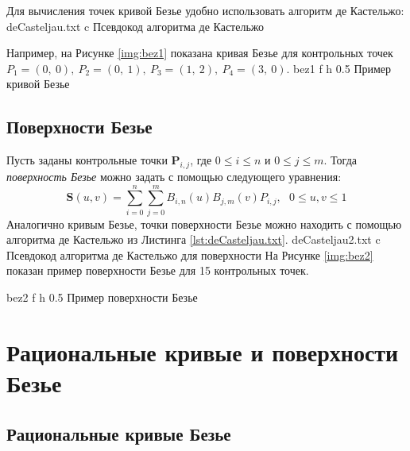 \documentclass{bmstu}
\begin{document}
Для вычисления точек кривой Безье удобно использовать алгоритм де Кастельжо:
{deCasteljau.txt} %
{c} %
{Псевдокод алгоритма де Кастельжо} %

Например, на Рисунке \ref{img:bez1} показана кривая Безье для контрольных точек $P_1 = (0,~0),~P_2=(0,~1),~P_3=(1,~2),~P_4=(3,~0)$.
{bez1} %
{f} %
{h} %
{0.5\textwidth} %
{Пример кривой Безье} %

\subsection{Поверхности Безье}

Пусть заданы контрольные точки $\mathbf{P}_{i,j}$, где $0 \le i \le n$ и $0 \le j \le m$.
Тогда \textit{поверхность Безье} можно задать с помощью следующего уравнения:
\begin{equation}
    \mathbf{S}(u,v)=\sum\limits_{i=0}^n\sum\limits_{j=0}^m B_{i,n}(u)B_{j,m}(v)P_{i,j},~~~ 0\le u,v\le 1
\end{equation}
Аналогично кривым Безье, точки поверхности Безье можно находить с помощью алгоритма де Кастельжо из Листинга \ref{lst:deCasteljau.txt}.
{deCasteljau2.txt} %
{c} %
{Псевдокод алгоритма де Кастельжо для поверхности} %
На Рисунке \ref{img:bez2} показан пример поверхности Безье для 15 контрольных точек.

{bez2} %
{f} %
{h} %
{0.5\textwidth} %
{Пример поверхности Безье} %

\section{Рациональные кривые и поверхности Безье}
\subsection{Рациональные кривые Безье}
\end{document}
